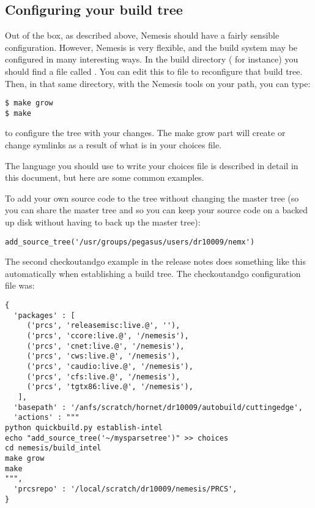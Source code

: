 \documentclass[a4paper]{article}
\newcommand{\dir}   {\begingroup \urlstyle{tt}\Url}
\newcommand{\script}{\begingroup \urlstyle{tt}\Url}
\begin{document}
\subsection{Configuring your build tree}
Out of the box, as described above, Nemesis should have a fairly
sensible configuration. However, Nemesis is very flexible, and the
build system may be configured in many interesting ways. In the build
directory (\dir{nemesis/build_intel} for instance) you should find a file
called \script{choices}. You can edit this to file to reconfigure that
build tree. Then, in that same directory, with the Nemesis tools on
your path, you can type:

\begin{verbatim}
$ make grow
$ make
\end{verbatim}

to configure the tree with your changes. The make grow part will
create or change symlinks as a result of what is in your choices file.

The language you should use to write your choices file is described in
detail in this document, but here are some common examples.

To add your own source code to the tree without changing the master
tree (so you can share the master tree and so you can keep your source
code on a backed up disk without having to back up the master tree):

\begin{verbatim}
add_source_tree('/usr/groups/pegasus/users/dr10009/nemx')
\end{verbatim}

The second checkoutandgo example in the release notes does something
like this automatically when establishing a build tree.  The
checkoutandgo configuration file was:

\begin{verbatim}
{
  'packages' : [
     ('prcs', 'releasemisc:live.@', ''),
     ('prcs', 'ccore:live.@', '/nemesis'),
     ('prcs', 'cnet:live.@', '/nemesis'),
     ('prcs', 'cws:live.@', '/nemesis'),
     ('prcs', 'caudio:live.@', '/nemesis'),
     ('prcs', 'cfs:live.@', '/nemesis'),
     ('prcs', 'tgtx86:live.@', '/nemesis'),
   ],
  'basepath' : '/anfs/scratch/hornet/dr10009/autobuild/cuttingedge',
  'actions' : """
python quickbuild.py establish-intel
echo "add_source_tree('~/mysparsetree')" >> choices
cd nemesis/build_intel
make grow
make
""",
  'prcsrepo' : '/local/scratch/dr10009/nemesis/PRCS',
}
\end{verbatim}
\end{document}
